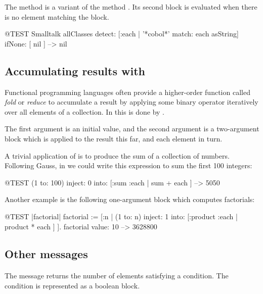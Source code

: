 \documentclass[a4paper,10pt,twoside]{book}
\begin{document}
The method  is a variant of the method . Its second block is evaluated
when there is no element matching the block.

\begin{code}{@TEST}
Smalltalk allClasses detect: [:each | '*cobol*' match: each asString] ifNone: [ nil ] --> nil
\end{code}

\subsection{Accumulating results with }
Functional programming languages often provide a higher-order function called \emph{fold} or \emph{reduce} to accumulate a result by applying some binary operator iteratively over all elements of a collection.
In \pharo this is done by .

The first argument is an initial value, and the second argument is a two-argument block which is applied to the result this far, and each element in turn.

A trivial application of  is to produce the sum of a collection of numbers.
Following Gauss, in \pharo we could write this expression to sum the first 100 integers:
\begin{code}{@TEST}
(1 to: 100) inject: 0 into: [:sum :each | sum + each ] --> 5050
\end{code}

Another example is the following one-argument block which computes factorials:
\begin{code}{@TEST |factorial|}
factorial := [:n | (1 to: n) inject: 1 into: [:product :each | product * each ] ].
factorial value: 10 --> 3628800
\end{code}

\subsection{Other messages}

\paragraph{} The message  returns the number of elements satisfying a condition.  The condition is represented as a boolean block.
\end{document}
